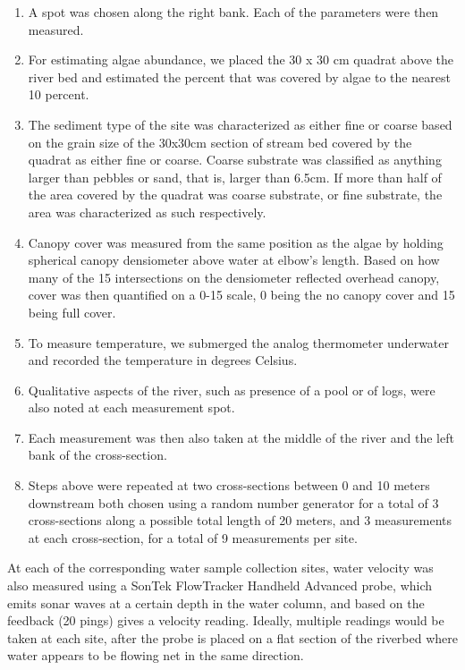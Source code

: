 \documentclass{article}\usepackage[]{graphicx}\usepackage[]{color}
\begin{document}
\begin{enumerate}
\item A spot was chosen along the right bank. Each of the parameters were then measured.
\item For estimating algae abundance, we placed the 30  x 30 cm quadrat above the river bed and estimated the percent that was covered by algae to the nearest 10 percent.

\item The sediment type of the site was characterized as either fine or coarse based on the grain size of the 30x30cm section of stream bed covered by the quadrat as either fine or coarse. Coarse substrate was classified as anything larger than pebbles or sand, that is, larger than 6.5cm. If more than half of the area covered by the quadrat was coarse substrate, or fine substrate, the area was characterized as such respectively.

\item Canopy cover was measured from the same position as the algae by holding spherical canopy densiometer above water at elbow's length. Based on how many of the 15 intersections on the densiometer reflected overhead canopy, cover was then quantified on a 0-15 scale, 0 being the no canopy cover and 15 being full cover.

\item To measure temperature, we submerged the analog thermometer underwater and recorded the temperature in degrees Celsius.

\item Qualitative aspects of the river, such as presence of a pool or of logs, were also noted at each measurement spot.

\item Each measurement was then also taken at the middle of the river and the left bank of the cross-section. 

\item Steps above were repeated at two cross-sections between 0 and 10 meters downstream both chosen using a random number generator for a total of 3 cross-sections along a possible total length of 20 meters, and 3 measurements at each cross-section, for a total of 9 measurements per site. 
\end{enumerate}

At each of the corresponding water sample collection sites, water velocity was also measured using a SonTek FlowTracker Handheld Advanced probe, which emits sonar waves at a certain depth in the water column, and based on the feedback (20 pings) gives a velocity reading. Ideally, multiple readings would be taken at each site, after the probe is placed on a flat section of the riverbed where water appears to be flowing net in the same direction. 
\end{document}
